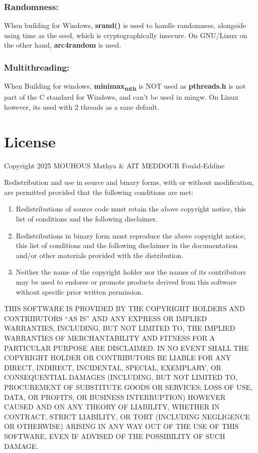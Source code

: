 \documentclass[11pt]{article}
\begin{document}
\subsubsection{Randomness:}
\label{sec:org5243b5d}
When building for Windows, \textbf{srand()} is used to handle randomness, alongside using time as the seed, which is cryptographically insecure. On GNU/Linux on the other hand, \textbf{arc4random} is used.
\subsubsection{Multithreading:}
\label{sec:orga9d318f}
When Building for windows, \textbf{minimax\textsubscript{mth}} is NOT used as \textbf{pthreads.h} is not part of the C standard for Windows, and can't be used in mingw. On Linux however, its used with 2 threads as a sane default.
\section{License}
\label{sec:orgc483a37}
Copyright 2025 MOUHOUS Mathya \& AIT MEDDOUR Fouâd-Eddine

Redistribution and use in source and binary forms, with or without modification, are permitted provided that the following conditions are met:

\begin{enumerate}
\item Redistributions of source code must retain the above copyright notice, this list of conditions and the following disclaimer.

\item Redistributions in binary form must reproduce the above copyright notice, this list of conditions and the following disclaimer in the documentation and/or other materials provided with the distribution.

\item Neither the name of the copyright holder nor the names of its contributors may be used to endorse or promote products derived from this software without specific prior written permission.
\end{enumerate}

THIS SOFTWARE IS PROVIDED BY THE COPYRIGHT HOLDERS AND CONTRIBUTORS “AS IS” AND ANY EXPRESS OR IMPLIED WARRANTIES, INCLUDING, BUT NOT LIMITED TO, THE IMPLIED WARRANTIES OF MERCHANTABILITY AND FITNESS FOR A PARTICULAR PURPOSE ARE DISCLAIMED. IN NO EVENT SHALL THE COPYRIGHT HOLDER OR CONTRIBUTORS BE LIABLE FOR ANY DIRECT, INDIRECT, INCIDENTAL, SPECIAL, EXEMPLARY, OR CONSEQUENTIAL DAMAGES (INCLUDING, BUT NOT LIMITED TO, PROCUREMENT OF SUBSTITUTE GOODS OR SERVICES; LOSS OF USE, DATA, OR PROFITS; OR BUSINESS INTERRUPTION) HOWEVER CAUSED AND ON ANY THEORY OF LIABILITY, WHETHER IN CONTRACT, STRICT LIABILITY, OR TORT (INCLUDING NEGLIGENCE OR OTHERWISE) ARISING IN ANY WAY OUT OF THE USE OF THIS SOFTWARE, EVEN IF ADVISED OF THE POSSIBILITY OF SUCH DAMAGE.
\end{document}
